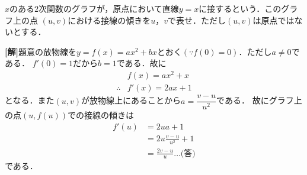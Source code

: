 \documentclass[a4j]{jarticle}
\title{}
\begin{document}

\begin{oframed}
$x$のある$2$次関数のグラフが，原点において直線$y=x$に接するという．このグラフ上の点
$(u,v)$における接線の傾きを$u$，$v$で表せ．ただし$(u,v)$は原点ではないとする．
\end{oframed}

\setlength{\columnseprule}{0.4pt}
\begin{multicols}{2}
{\bf[解]}題意の放物線を$y=f(x)=ax^2+bx$とおく$(\because f(0)=0)$．ただし$a\not=0$である．
$f'(0)=1$だから$b=1$である．故に
     \begin{align*}
     &f(x)=ax^2+x \\
     \therefore &f'(x)=2ax+1
     \end{align*}
となる．また$(u,v)$が放物線上にあることから$a=\dfrac{v-u}{u^2}$である．
故にグラフ上の点$(u,f(u))$での接線の傾きは
     \begin{align*}
     f'(u)&=2ua+1 \\
     &=2u\frac{v-u}{u^2}+1 \\
     &=\frac{2v-u}{u}\dots\text{(答)}
     \end{align*}
である．          
\newpage
\end{multicols}
\end{document}
